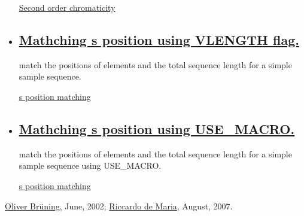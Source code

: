 \begin{itemize}
\href{http://cern.ch/madx/madX/examples/match/lhc.qpp/job.lhc.qpp.madx}{Second order chromaticity}%
	\item 

\subsection{\href{cell}{Mathching s position using VLENGTH flag.}} match the positions of elements and the total sequence length for a simple sample sequence. 

\href{http://cern.ch/madx/madX/examples/match/s-match/job.s-match.madx}{s position matching}%
	\item 

\subsection{\href{cell}{Mathching s position using USE\_MACRO.}} match the positions of elements and the total sequence length for a simple sample sequence using USE\_MACRO. 

\href{http://cern.ch/madx/madX/examples/match/s-match-usemacro/job.s-match-usemacro.madx}{s position matching}%
\end{itemize}\href{http://bruening.home.cern.ch/bruening/}{Oliver Br\"uning}, June, 2002; \href{http://rdemaria.home.cern.ch/rdemaria/}{Riccardo de Maria}, August, 2007. 

